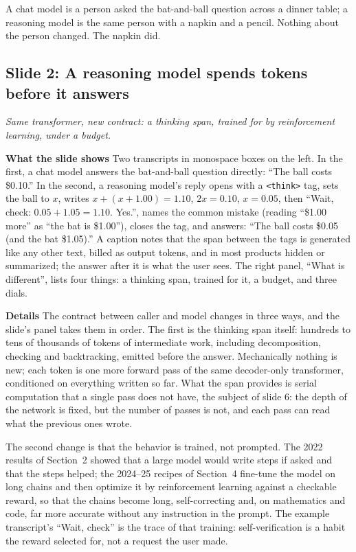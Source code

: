 \documentclass[11pt,letterpaper]{article}
\newcommand{\slide}[3]{%
  \subsection[Slide #1: #2]{Slide #1: #2}%
  {\color{muted}\itshape #3\par}\medskip}
\newcommand{\para}[1]{\medskip\noindent\textbf{#1}\quad}
\newenvironment{intuition}{\begin{tcolorbox}[intuitionbox]}{\end{tcolorbox}}
\begin{document}
\begin{intuition}
A chat model is a person asked the bat-and-ball question across a dinner table; a reasoning model is the same person with a napkin and a pencil. Nothing about the person changed. The napkin did.
\end{intuition}

\slide{2}{A reasoning model spends tokens before it answers}{Same transformer, new contract: a thinking span, trained for by reinforcement learning, under a budget.}

\para{What the slide shows} Two transcripts in monospace boxes on the left. In the first, a chat model answers the bat-and-ball question directly: ``The ball costs \$0.10.'' In the second, a reasoning model's reply opens with a \texttt{<think>} tag, sets the ball to $x$, writes $x + (x+1.00) = 1.10$, $2x = 0.10$, $x = 0.05$, then ``Wait, check: $0.05 + 1.05 = 1.10$. Yes.'', names the common mistake (reading ``\$1.00 more'' as ``the bat is \$1.00''), closes the tag, and answers: ``The ball costs \$0.05 (and the bat \$1.05).'' A caption notes that the span between the tags is generated like any other text, billed as output tokens, and in most products hidden or summarized; the answer after it is what the user sees. The right panel, ``What is different'', lists four things: a thinking span, trained for it, a budget, and three dials.

\para{Details} The contract between caller and model changes in three ways, and the slide's panel takes them in order. The first is the thinking span itself: hundreds to tens of thousands of tokens of intermediate work, including decomposition, checking and backtracking, emitted before the answer. Mechanically nothing is new; each token is one more forward pass of the same decoder-only transformer, conditioned on everything written so far. What the span provides is serial computation that a single pass does not have, the subject of slide 6: the depth of the network is fixed, but the number of passes is not, and each pass can read what the previous ones wrote.

The second change is that the behavior is trained, not prompted. The 2022 results of Section~2 showed that a large model would write steps if asked and that the steps helped; the 2024--25 recipes of Section~4 fine-tune the model on long chains and then optimize it by reinforcement learning against a checkable reward, so that the chains become long, self-correcting and, on mathematics and code, far more accurate without any instruction in the prompt. The example transcript's ``Wait, check'' is the trace of that training: self-verification is a habit the reward selected for, not a request the user made.
\end{document}
